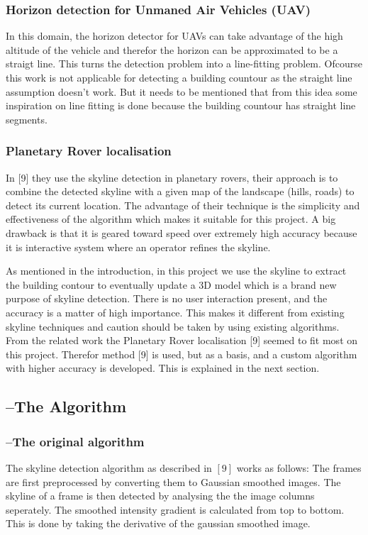 \subsubsection{Horizon detection for Unmaned Air Vehicles (UAV)}
In this domain, the horizon detector for UAVs can take advantage of the high
altitude of the vehicle and therefor the horizon can be approximated to be a
straigt line.  This turns the detection problem into a line-fitting problem.
Ofcourse this work is not applicable for detecting a building countour as the
straight line assumption doesn't work. But it needs to be mentioned that from this
idea some inspiration on line fitting is done because the building countour has
straight line segments.

\subsubsection{Planetary Rover localisation}
In [9] they use the skyline detection in planetary rovers, their approach is to
combine the detected skyline with a given map of the landscape (hills, roads) to
detect its current location. 
The advantage of their technique is the simplicity and effectiveness of the
algorithm which makes it suitable for this project.  A big drawback is that it
is geared toward speed over extremely high accuracy because it is 
interactive system where an operator refines the skyline.

As mentioned in the introduction, in this project we use the skyline to extract
the building contour to eventually update a 3D model which is a brand new
purpose of skyline detection.  There is no user interaction present, and the
accuracy is a matter of high importance.  This makes it different from existing
skyline techniques and caution should be taken by using existing algorithms.
From the related work the Planetary Rover localisation [9] seemed to fit most on
this project.  Therefor method [9] is used, but as a basis, and a custom
algorithm with higher accuracy is developed. This is explained in the next
section.



 \subsection{--The Algorithm}
 \subsubsection{--The original algorithm}
The skyline detection algorithm as described in $[9]$ works as follows:
The frames are first preprocessed by converting them to Gaussian smoothed images.
The skyline of a frame is then detected by analysing the the image columns
seperately.
The smoothed intensity gradient is calculated from top to bottom. This is done
by taking the derivative of the gaussian smoothed image.

